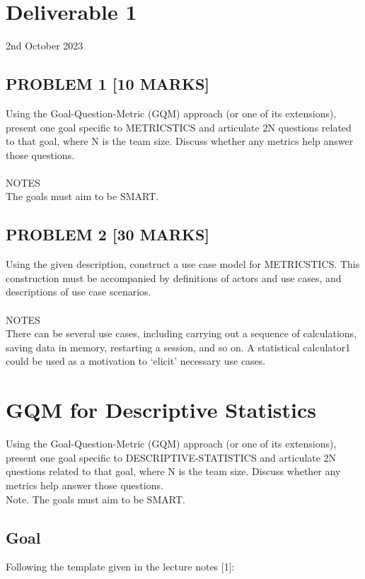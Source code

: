 \section* {Deliverable 1}
2nd October 2023

    \subsection*{PROBLEM 1 [10 MARKS]}

    Using the Goal-Question-Metric (GQM) approach (or one of its extensions), present one goal specific to METRICSTICS and articulate 2N questions related to that goal, where N is the team size. Discuss whether any metrics help answer those questions. 
    \\\\
    NOTES
    \\
    The goals must aim to be SMART.

    \subsection*{PROBLEM 2 [30 MARKS]} 
    Using the given description, construct a use case model for METRICSTICS. This construction must be accompanied by definitions of actors and use cases, and descriptions of use case scenarios.
    \\\\
    NOTES
    \\
    There can be several use cases, including carrying out a sequence of calculations, saving data in memory, restarting a session, and so on. A statistical calculator1 could be used as a motivation to `elicit' necessary use cases.

\pagebreak

\section {GQM for Descriptive Statistics}
    Using the Goal-Question-Metric (GQM) approach (or one of its extensions), present one goal specific to DESCRIPTIVE-STATISTICS and articulate 2N questions related to that goal, where N is the team size. Discuss whether any metrics help answer those questions.\\ Note. The goals must aim to be SMART.
  
    \subsection{Goal}
    Following the template given in the lecture notes {[}1{]}:
    

